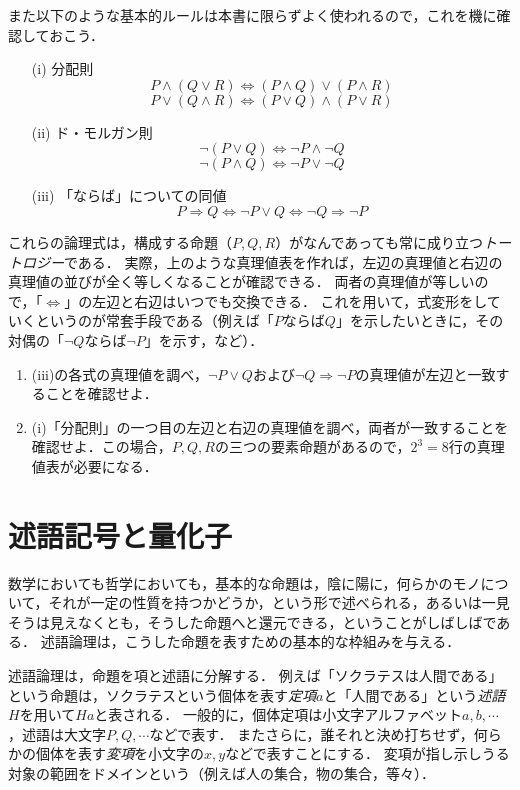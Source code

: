 \documentclass[11pt,a4paper]{jsarticle}
\begin{document}
また以下のような基本的ルールは本書に限らずよく使われるので，これを機に確認しておこう．
\begin{itemize}
    \item[(i)] 分配則
    \[ P \wedge ( Q \vee R ) \iff (P \wedge Q) \vee (P \wedge R) \]
    \[ P \vee ( Q \wedge R ) \iff (P \vee Q) \wedge (P \vee R) \]
    \item[(ii)] ド・モルガン則
    \[ \neg (P \vee Q) \iff \neg P \wedge \neg Q \]
    \[ \neg (P \wedge Q) \iff \neg P \vee \neg Q \]
    \item[(iii)] 「ならば」についての同値
    \[ P \Rightarrow Q \iff \neg P \vee Q \iff \neg Q \Rightarrow \neg P \] 
\end{itemize}

これらの論理式は，構成する命題（$P, Q, R$）がなんであっても常に成り立つ\emph{トートロジー}である．
実際，上のような真理値表を作れば，左辺の真理値と右辺の真理値の並びが全く等しくなることが確認できる．
両者の真理値が等しいので，「$\iff$」の左辺と右辺はいつでも交換できる．
これを用いて，式変形をしていくというのが常套手段である（例えば「$P$ならば$Q$」を示したいときに，その対偶の「$\neg Q$ならば$\neg P$」を示す，など）．


\begin{exercise} 
 \begin{enumerate}
     \item (iii)の各式の真理値を調べ，$\neg P \vee Q$および$\neg Q \Rightarrow \neg P$の真理値が左辺と一致することを確認せよ．
     \item (i)「分配則」の一つ目の左辺と右辺の真理値を調べ，両者が一致することを確認せよ．この場合，$P, Q, R$の三つの要素命題があるので，$2^3=8$行の真理値表が必要になる．
 \end{enumerate}
\end{exercise}

\section{述語記号と量化子}
数学においても哲学においても，基本的な命題は，陰に陽に，何らかのモノについて，それが一定の性質を持つかどうか，という形で述べられる，あるいは一見そうは見えなくとも，そうした命題へと還元できる，ということがしばしばである．
述語論理は，こうした命題を表すための基本的な枠組みを与える．

述語論理は，命題を項と述語に分解する．
例えば「ソクラテスは人間である」という命題は，ソクラテスという個体を表す\emph{定項}$a$と「人間である」という\emph{述語}$H$を用いて$Ha$と表される．
一般的に，個体定項は小文字アルファベット$a, b, \cdots$，述語は大文字$P, Q, \cdots$などで表す．
またさらに，誰それと決め打ちせず，何らかの個体を表す\emph{変項}を小文字の$x, y$などで表すことにする． 
変項が指し示しうる対象の範囲をドメインという（例えば人の集合，物の集合，等々）．
\end{document}

